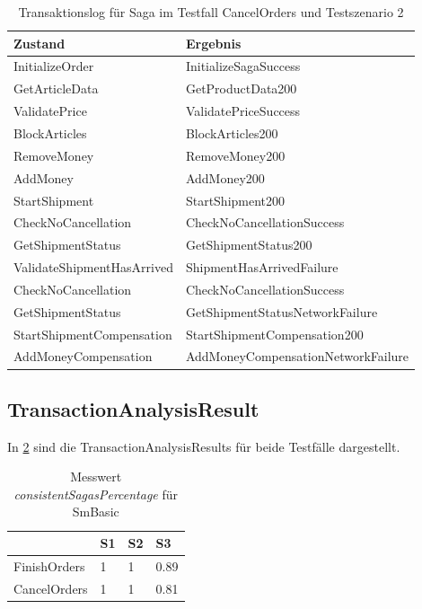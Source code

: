 \begin{center}
	\fontsize{9}{12}\selectfont
	\begin{longtable}[h]{|p{4.5cm}|p{7cm}|}
		\hline
		Zustand & Ergebnis \\* \hline
		\endhead
		\hline
		\caption{Transaktionslog für Saga im Testfall CancelOrders und Testszenario 2}
		\label{tab:transaktionslog_ts2_cancelorders_smbasic}
		\endfoot
		InitializeOrder &  InitializeSagaSuccess \\* \hline
		GetArticleData &  GetProductData200 \\* \hline
		ValidatePrice &  ValidatePriceSuccess \\* \hline
		BlockArticles &  BlockArticles200 \\* \hline
		RemoveMoney &  RemoveMoney200 \\* \hline
		AddMoney &  AddMoney200 \\* \hline
		StartShipment &  StartShipment200 \\* \hline
		CheckNoCancellation &  CheckNoCancellationSuccess \\* \hline
		GetShipmentStatus &  GetShipmentStatus200 \\* \hline
		\rowcolor{Gray}
		ValidateShipmentHasArrived &  ShipmentHasArrivedFailure \\* \hline
		CheckNoCancellation &  CheckNoCancellationSuccess \\* \hline
		GetShipmentStatus &  GetShipmentStatusNetworkFailure \\* \hline
		StartShipmentCompensation &  StartShipmentCompensation200 \\* \hline
		\rowcolor{Gray}
		AddMoneyCompensation &  AddMoneyCompensationNetworkFailure \\* \hline
	\end{longtable}
\end{center}
\FloatBarrier

\subsection{TransactionAnalysisResult}
In \cref{tab:smbasic_stateanalysisresult} sind die TransactionAnalysisResults für beide Testfälle dargestellt. 

\begin{center}
	\fontsize{9}{12}\selectfont
	\begin{longtable}[h]{|p{5cm}|p{1cm}|p{1cm}|p{1cm}|}
		\hline
		 & S1 & S2 & S3 \\ \hline
		\endhead
		\caption{Messwert \textit{consistentSagasPercentage} für SmBasic}
		\label{tab:smbasic_stateanalysisresult}
		\endfoot
		FinishOrders & 1 & 1 & 0.89\\ \hline	
		CancelOrders & 1 & 1 & 0.81\\ \hline
	\end{longtable}
\end{center}
\FloatBarrier

